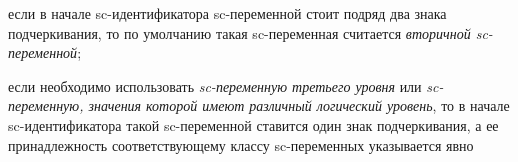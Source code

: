 \begin{SCn}
\begin{scnstruct}
\begin{scnsubstruct}
\begin{scnindent}
\begin{scneqtovector}
\begin{scnindent}
\begin{scneqtoset}
\begin{scnindent}
\begin{scnindent}
{\begin{scnitemize}
                                            \item если в начале sc-идентификатора sc-переменной стоит подряд два знака подчеркивания, то по умолчанию такая sc-переменная считается \textit{вторичной sc-переменной};
                                            \item если необходимо использовать \textit{sc-переменную третьего уровня} или \textit{sc-переменную, значения которой имеют различный логический уровень}, то в начале sc-идентификатора такой sc-переменной ставится один знак подчеркивания, а ее принадлежность соответствующему классу sc-переменных указывается явно
                                        \end{scnitemize}}
                                \end{scnindent}
                                \begin{scnindent}
                                    \scneqfileclass{\scnstar}
                                \end{scnindent}
                                \begin{scnindent}
                                    \scneqfileclass{\scnrolesign}
                                \end{scnindent}
                                \begin{scnindent}
                                    \scneqfileclass{\scnsupergroupsign}
                                \end{scnindent}
                                \begin{scnindent}
                                    \scneqfileclass{\scnhyphen}

\end{scnindent}
\end{scnindent}
\end{scneqtoset}
\end{scnindent}
\end{scneqtovector}
\end{scnindent}
\end{scnsubstruct}
\end{scnstruct}
\end{SCn}
